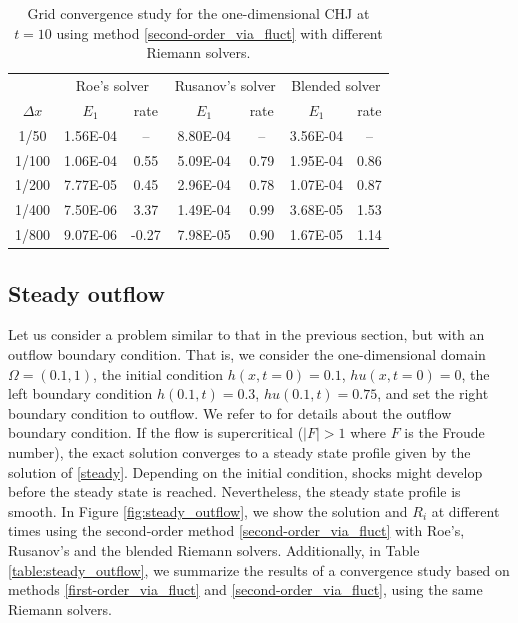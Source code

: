 \documentclass[preprint, 11pt]{article}
\begin{document}
\begin{table}[!ht]\scriptsize
  \begin{center}
    \begin{tabular}{||c||c|c||c|c||c|c||} \hline
      & \multicolumn{2}{c||}{Roe's solver}  
      &\multicolumn{2}{c||}{Rusanov's solver} 
      &\multicolumn{2}{c||}{Blended solver} \\ \cline{2-7}
      $\Delta x$ & $E_1$ & rate & $E_1$ & rate & $E_1$ & rate \\ \hline
      1/50  & 1.56E-04 &  --   & 8.80E-04 &  --  & 3.56E-04 &  --  \\
      1/100 & 1.06E-04 & 0.55  & 5.09E-04 & 0.79 & 1.95E-04 & 0.86 \\
      1/200 & 7.77E-05 & 0.45  & 2.96E-04 & 0.78 & 1.07E-04 & 0.87 \\
      1/400 & 7.50E-06 & 3.37  & 1.49E-04 & 0.99 & 3.68E-05 & 1.53 \\
      1/800 & 9.07E-06 & -0.27 & 7.98E-05 & 0.90 & 1.67E-05 & 1.14 \\ \hline
    \end{tabular}
    \caption{Grid convergence study for the one-dimensional CHJ at $t=10$
      using method \eqref{second-order_via_fluct} with different Riemann solvers.\label{table:chj_1D}}
  \end{center}
\end{table}

\subsection{Steady outflow}\label{sec:steady_outflow}
Let us consider a problem similar to that in the previous section, but with an outflow boundary condition. 
That is, we consider the one-dimensional domain $\Omega=(0.1,1)$, the initial condition 
$h(x,t=0)=0.1$, $hu(x,t=0)=0$, the left boundary condition $h(0.1,t)=0.3$, $hu(0.1,t)=0.75$, 
and set the right boundary condition to outflow.
We refer to \cite[\S 21.8.5]{leveque2002finite} for details about the outflow boundary condition. 
If the flow is supercritical ($|F|>1$ where $F$ is the Froude number), the exact solution converges to a 
steady state profile given by the solution of \eqref{steady}. 
Depending on the initial condition, shocks might develop before the steady state is reached. 
Nevertheless, the steady state profile is smooth. 
In Figure \ref{fig:steady_outflow}, we show the solution and $R_i$ at different times using
the second-order method \eqref{second-order_via_fluct}
with Roe's, Rusanov's and the blended Riemann solvers.
Additionally, in Table \ref{table:steady_outflow}, we summarize the results of a convergence study 
based on methods \eqref{first-order_via_fluct} and
\eqref{second-order_via_fluct}, using the same Riemann solvers.  
\end{document}
